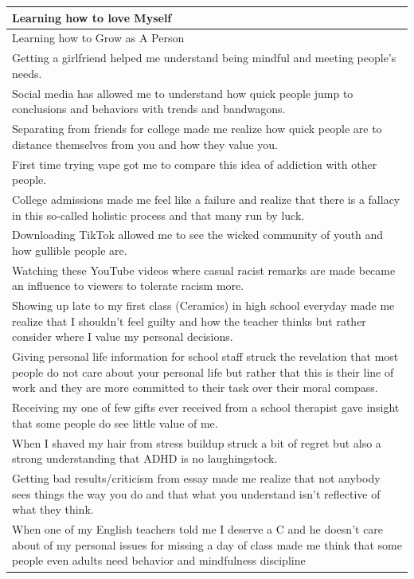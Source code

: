 \documentclass[
  .7em,
  letterpaper,
  DIV=11,
  numbers=noendperiod]{scrartcl}
\begin{document}
\begin{table}
\begin{tabular}{l}
\hline
Learning how to love Myself\\
\hline
Learning how to Grow as A Person\\
\hline
Getting a girlfriend helped me understand being mindful and meeting people's needs.\\
\hline
Social media has allowed me to understand how quick people jump to conclusions and behaviors with trends and bandwagons.\\
\hline
Separating from friends for college made me realize how quick people are to distance themselves from you and how they value you.\\
\hline
First time trying vape got me to compare this idea of addiction with other people.\\
\hline
College admissions made me feel like a failure and realize that there is a fallacy in this so-called holistic process and that many run by luck.\\
\hline
Downloading TikTok allowed me to see the wicked community of youth and how gullible people are.\\
\hline
Watching these YouTube videos where casual racist remarks are made became an influence to viewers to tolerate racism more.\\
\hline
Showing up late to my first class (Ceramics) in high school everyday made me realize that I shouldn't feel guilty and how the teacher thinks but rather consider where I value my personal decisions.\\
\hline
Giving personal life information for school staff struck the revelation that most people do not care about your personal life but rather that this is their line of work and they are more committed to their task over their moral compass.\\
\hline
Receiving my one of few gifts ever received from a school therapist gave insight that some people do see little value of me.\\
\hline
When I shaved my hair from stress buildup struck a bit of regret but also a strong understanding that ADHD is no laughingstock.\\
\hline
Getting bad results/criticism from essay made me realize that not anybody sees things the way you do and that what you understand isn't reflective of what they think.\\
\hline
When one of my English teachers told me I deserve a C and he doesn't care about of my personal issues for missing a day of class made me think that some people even adults need behavior and mindfulness discipline\\

\end{tabular}
\end{table}
\end{document}
